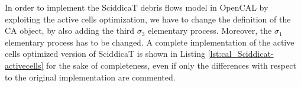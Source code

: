 In order to implement the SciddicaT debris flows model in OpenCAL by
exploiting the active cells optimization, we have to change the
definition of the CA object, by also adding the third $\sigma_3$
elementary process. Moreover, the $\sigma_1$ elementary process has to
be changed. A complete implementation of the active cells optimized
version of SciddicaT is shown in Listing
\ref{lst:cal_Sciddicat-activecells} for the sake of completeness, even
if only the differences with respect to the original implementation
are commented.










